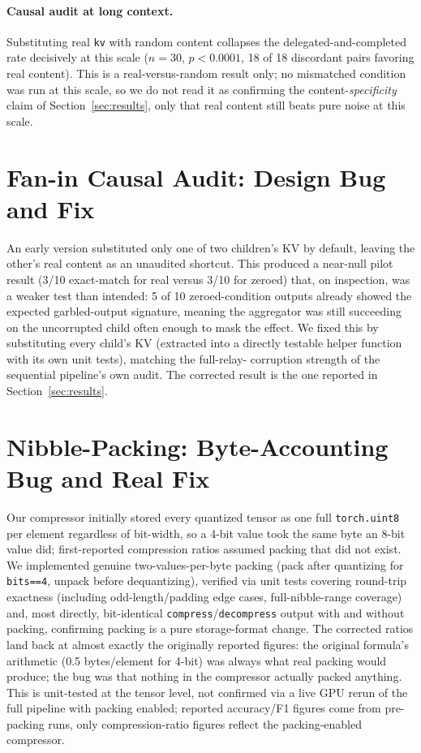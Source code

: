 \documentclass[11pt]{article}
\begin{document}
\paragraph{Causal audit at long context.} Substituting real \texttt{kv}
with random content collapses the delegated-and-completed rate
decisively at this scale ($n=30$, $p<0.0001$, 18 of 18 discordant
pairs favoring real content). This is a real-versus-random result
only; no mismatched condition was run at this scale, so we do not read
it as confirming the content-\emph{specificity} claim of
Section~\ref{sec:results}, only that real content still beats pure
noise at this scale.

\section{Fan-in Causal Audit: Design Bug and Fix}
\label{app:faninbug}

An early version substituted only one of two children's KV by default,
leaving the other's real content as an unaudited shortcut. This
produced a near-null pilot result (3/10 exact-match for real versus
3/10 for zeroed) that, on inspection, was a weaker test than intended:
5 of 10 zeroed-condition outputs already showed the expected
garbled-output signature, meaning the aggregator was still succeeding
on the uncorrupted child often enough to mask the effect. We fixed this
by substituting every child's KV (extracted into a directly testable
helper function with its own unit tests), matching the full-relay-
corruption strength of the sequential pipeline's own audit. The
corrected result is the one reported in Section~\ref{sec:results}.

\section{Nibble-Packing: Byte-Accounting Bug and Real Fix}
\label{app:nibble}

Our compressor initially stored every quantized tensor as one full
\texttt{torch.uint8} per element regardless of bit-width, so a 4-bit
value took the same byte an 8-bit value did; first-reported compression
ratios assumed packing that did not exist. We implemented genuine
two-values-per-byte packing (pack after quantizing for \texttt{bits==4},
unpack before dequantizing), verified via unit tests covering
round-trip exactness (including odd-length/padding edge cases,
full-nibble-range coverage) and, most directly, bit-identical
\texttt{compress}/\texttt{decompress} output with and without packing,
confirming packing is a pure storage-format change. The corrected
ratios land back at almost exactly the originally reported figures: the
original formula's arithmetic (0.5 bytes/element for 4-bit) was always
what real packing would produce; the bug was that nothing in the
compressor actually packed anything. This is unit-tested at the tensor
level, not confirmed via a live GPU rerun of the full pipeline with
packing enabled; reported accuracy/F1 figures come from pre-packing
runs, only compression-ratio figures reflect the packing-enabled
compressor.
\end{document}

